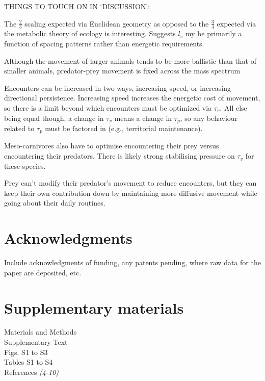 \documentclass[12pt]{article}
\begin{document}
\noindent THINGS TO TOUCH ON IN `DISCUSSION': 

 The $\frac{2}{3}$ scaling expected via Euclidean geometry as opposed to the $\frac{3}{4}$ expected via the metabolic theory of ecology is interesting. Suggests $l_v$ my be primarily a function of spacing patterns rather than energetic requirements.

Although the movement of larger animals tends to be more ballistic than that of smaller animals, predator-prey movement is fixed across the mass spectrum

Encounters can be increased in two ways, increasing speed, or increasing directional persistence. Increasing speed increases the energetic cost of movement, so there is a limit beyond which encounters must be optimized via $\tau_v$. All else being equal though, a change in $\tau_v$ means a change in $\tau_p$, so any behaviour related to $\tau_p$ must be factored in (e.g., territorial maintenance).

Meso-carnivores also have to optimise encountering their prey versus encountering their predators. There is likely strong stabilising pressure on $\tau_v$ for these species.

Prey can't modify their predator's movement to reduce encounters, but they can keep their own contribution down by maintaining more diffusive movement while going about their daily routines.











\section*{Acknowledgments}
Include acknowledgments of funding, any patents pending, where raw data for the paper are deposited, etc.

\section*{Supplementary materials}
Materials and Methods\\
Supplementary Text\\
Figs. S1 to S3\\
Tables S1 to S4\\
References \textit{(4-10)}
\end{document}
